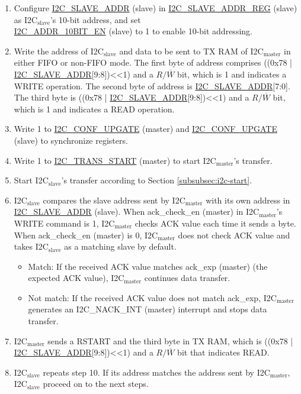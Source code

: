 \documentclass[main\_\_EN.tex]{subfiles}
\begin{document}
\begin{enumerate}
\item Configure \hyperref[fielddesc:I2CSLAVEADDR]{I2C\_SLAVE\_ADDR} (slave) in \hyperref[regdesc:I2CSLAVEADDRREG]{I2C\_SLAVE\_ADDR\_REG} (slave) as I2C$_\text{slave}$'s 10-bit address, and set \\\hyperref[fielddesc:I2CADDR10BITEN]{I2C\_ADDR\_10BIT\_EN} (slave) to 1 to enable 10-bit addressing.
\item Write the address of I2C$_\text{slave}$ and data to be sent to TX RAM of I2C$_\text{master}$ in either FIFO or non-FIFO mode. The first byte of address comprises ((0x78 | \hyperref[fielddesc:I2CSLAVEADDR]{I2C\_SLAVE\_ADDR}[9:8])<<1) and a $R/\overline W$ bit, which is 1 and indicates a WRITE operation. The second byte of address is \hyperref[fielddesc:I2CSLAVEADDR]{I2C\_SLAVE\_ADDR}[7:0]. The third byte is ((0x78 | \hyperref[fielddesc:I2CSLAVEADDR]{I2C\_SLAVE\_ADDR}[9:8])<<1) and a $R/\overline W$ bit, which is 1 and indicates a READ operation.

\item Write 1 to \hyperref[fielddesc:I2CCONFUPGATE]{I2C\_CONF\_UPGATE} (master) and \hyperref[fielddesc:I2CCONFUPGATE]{I2C\_CONF\_UPGATE} (slave) to synchronize registers.
\item Write 1 to \hyperref[fielddesc:I2CTRANSSTART]{I2C\_TRANS\_START} (master) to start I2C$_\text{master}$'s transfer.
\item Start I2C$_\text{slave}$'s transfer according to Section \ref{subsubsec:i2c-start}.
\item I2C$_\text{slave}$ compares the slave address sent by I2C$_\text{master}$ with its own address in \hyperref[fielddesc:I2CSLAVEADDR]{I2C\_SLAVE\_ADDR} (slave). When ack\_check\_en (master) in I2C$_\text{master}$'s WRITE command is 1, I2C$_\text{master}$ checks ACK value each time it sends a byte. When ack\_check\_en (master) is 0, I2C$_\text{master}$ does not check ACK value and takes I2C$_\text{slave}$ as a matching slave by default.
\begin{itemize}
\item Match: If the received ACK value matches ack\_exp (master) (the expected ACK value), I2C$_\text{master}$ continues data transfer.
\item Not match: If the received ACK value does not match ack\_exp, I2C$_\text{master}$ generates an I2C\_NACK\_INT (master) interrupt and stops data transfer.
\end{itemize}

\item I2C$_\text{master}$ sends a RSTART and the third byte in TX RAM, which is ((0x78 | \hyperref[fielddesc:I2CSLAVEADDR]{I2C\_SLAVE\_ADDR}[9:8])<<1) and a $R/\overline W$ bit that indicates READ.
\item I2C$_\text{slave}$ repeats step 10. If its address matches the address sent by I2C$_\text{master}$, I2C$_\text{slave}$ proceed on to the next steps.


\end{enumerate}
\end{document}
